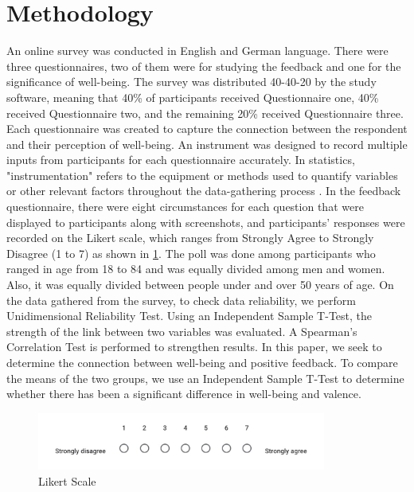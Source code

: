 \documentclass[conference]{IEEEtran}
\begin{document}
\section[htbp]{Methodology}

	An online survey was conducted in English and German language. There were three questionnaires, two of them were for studying the feedback and one for the significance of well-being. The survey was distributed 40-40-20 by the study software, meaning that 40\% of participants received Questionnaire one, 40\% received Questionnaire two, and the remaining 20\% received Questionnaire three. Each questionnaire was created to capture the connection between the respondent and their perception of well-being. An instrument was designed to record multiple inputs from participants for each questionnaire accurately. In statistics, "instrumentation" refers to the equipment or methods used to quantify variables or other relevant factors throughout the data-gathering process \cite{b9}. In the feedback questionnaire, there were eight circumstances for each question that were displayed to participants along with screenshots, and participants’ responses were recorded on the Likert scale, which ranges from Strongly Agree to Strongly Disagree (1 to 7) as shown in \figurename{\ref{Likert Scale}}. The poll was done among participants who ranged in age from 18 to 84 and was equally divided among men and women. Also, it was equally divided between people under and over 50 years of age. On the data gathered from the survey, to check data reliability, we perform Unidimensional Reliability Test. Using an Independent Sample T-Test, the strength of the link between two variables was evaluated. A Spearman's Correlation Test is performed to strengthen results. In this paper, we seek to determine the connection between well-being and positive feedback. To compare the means of the two groups, we use an Independent Sample T-Test to determine whether there has been a significant difference in well-being and valence. 

	\begin{figure}[htbp]
	\centerline{\includegraphics[width=95mm,scale=1]{likert_scale.jpeg}}
	\caption{Likert Scale}
	\label{Likert Scale}
	\end{figure}
\end{document}
